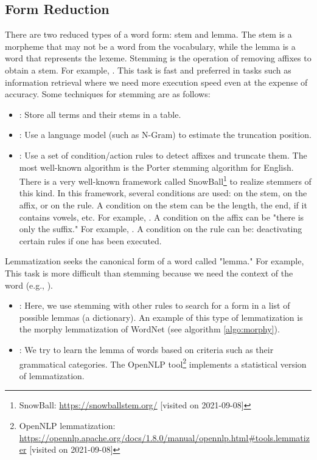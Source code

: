 \documentclass{KBook}
\begin{document}
\subsection{Form Reduction}

There are two reduced types of a word form: stem and lemma. 
The stem is a morpheme that may not be a word from the vocabulary, while the lemma is a word that represents the lexeme.
Stemming is the operation of removing affixes to obtain a stem. 
For example, . 
This task is fast and preferred in tasks such as information retrieval where we need more execution speed even at the expense of accuracy. 
Some techniques for stemming are as follows:
\begin{itemize}
	\item {}: Store all terms and their stems in a table. 
	\item {}: Use a language model (such as N-Gram) to estimate the truncation position.
	\item {}: Use a set of condition/action rules to detect affixes and truncate them. 
	The most well-known algorithm is the Porter stemming algorithm \cite{1980-porter} for English. 
	There is a very well-known framework called SnowBall\footnote{SnowBall: \url{https://snowballstem.org/} [visited on 2021-09-08]} to realize stemmers of this kind. 
	In this framework, several conditions are used: on the stem, on the affix, or on the rule. 
	A condition on the stem can be the length, the end, if it contains vowels, etc.
	For example, .
	A condition on the affix can be "there is only the suffix."
	For example, .
	A condition on the rule can be: deactivating certain rules if one has been executed.
\end{itemize}

Lemmatization seeks the canonical form of a word called "lemma."
For example, 
This task is more difficult than stemming because we need the context of the word (e.g., ). 
\begin{itemize}
	\item {}: Here, we use stemming with other rules to search for a form in a list of possible lemmas (a dictionary).
	An example of this type of lemmatization is the morphy lemmatization of WordNet (see algorithm \ref{algo:morphy}).
	
	\item {}: We try to learn the lemma of words based on criteria such as their grammatical categories.
	The OpenNLP tool\footnote{OpenNLP lemmatization: \url{https://opennlp.apache.org/docs/1.8.0/manual/opennlp.html\#tools.lemmatizer} [visited on 2021-09-08]} implements a statistical version of lemmatization.
	
\end{itemize}
\end{document}

